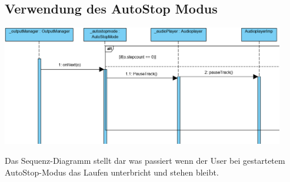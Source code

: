 \documentclass[../entwurf.tex]{subfiles}
\begin{document}
\subsection{Verwendung des AutoStop Modus}
\begin{center}
	\includegraphics[page=1,width=350pt,keepaspectratio]{../graphics/sequenz_diagramme/AutoStopDia.png}
\end{center}
Das Sequenz-Diagramm stellt dar was passiert wenn der User bei gestartetem AutoStop-Modus das Laufen unterbricht und stehen bleibt.
\end{document}

